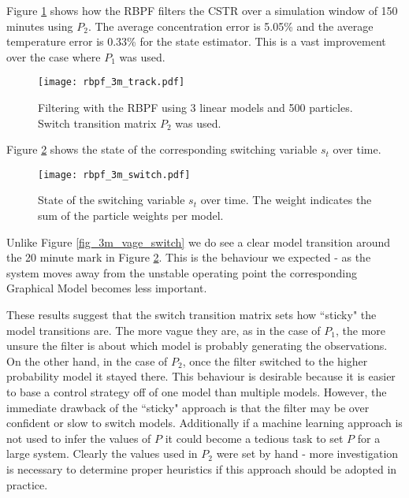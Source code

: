 Figure \ref{fig_3m_track} shows how the RBPF filters the CSTR over a simulation window of 150 minutes using $P_2$. The average concentration error is 5.05\% and the average temperature error is 0.33\% for the state estimator. This is a vast improvement over the case where $P_1$ was used.
\begin{figure}[H] 
\centering
\texttt{[image: rbpf\_3m\_track.pdf]}
\caption{Filtering with the RBPF using 3 linear models and 500 particles. Switch transition matrix $P_2$ was used.}
\label{fig_3m_track}
\end{figure}
Figure \ref{fig_3m_switch} shows the state of the corresponding switching variable $s_t$ over time.
\begin{figure}[H] 
\centering
\texttt{[image: rbpf\_3m\_switch.pdf]}
\caption{State of the switching variable $s_t$ over time. The weight indicates the sum of the particle weights per model.}
\label{fig_3m_switch}
\end{figure}
Unlike Figure \ref{fig_3m_vage_switch} we do see a clear model transition around the 20 minute mark in Figure \ref{fig_3m_switch}. This is the behaviour we expected - as the system moves away from the unstable operating point the corresponding Graphical Model becomes less important.

These results suggest that the switch transition matrix sets how ``sticky" the model transitions are. The more vague they are, as in the case of $P_1$, the more unsure the filter is about which model is probably generating the observations. On the other hand, in the case of $P_2$, once the filter switched to the higher probability model it stayed there. This behaviour is desirable because it is easier to base a control strategy off of one model than multiple models. However, the immediate drawback of the ``sticky" approach is that the filter may be over confident or slow to switch models. Additionally if a machine learning approach is not used to infer the values of $P$ it could become a tedious task to set $P$ for a large system. Clearly the values used in $P_2$ were set by hand - more investigation is necessary to determine proper heuristics if this approach should be adopted in practice.

